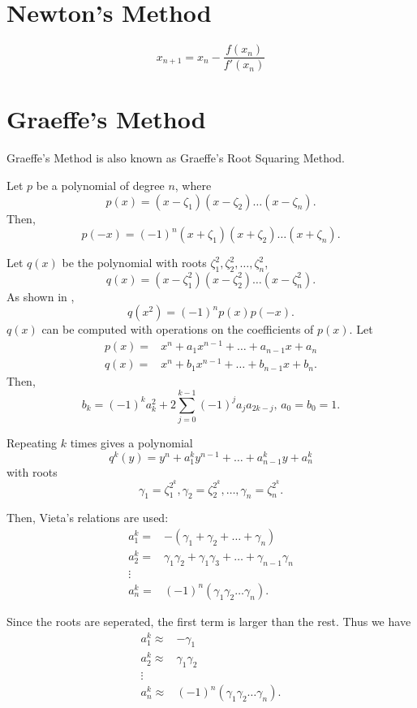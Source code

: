 \documentclass{article}
\begin{document}
\section{Newton's Method}

\begin{equation}
	x_{n+1}=x_n-\frac{f(x_n)}{f'(x_n)}
\end{equation}

\section{Graeffe's Method}

Graeffe's Method is also known as Graeffe's Root Squaring Method.

Let $p$ be a polynomial of degree $n$, where 
\[p(x)=(x-\zeta_1)(x-\zeta_2)\dots(x-\zeta_n).\]
Then,
\[p(-x)=(-1)^n(x+\zeta_1)(x+\zeta_2)\dots(x+\zeta_n).\]

Let $q(x)$ be the polynomial with roots $\zeta_1^2,\zeta_2^2,\dots,\zeta_n^2$,
\[q(x)=(x-\zeta_1^2)(x-\zeta_2^2)\dots(x-\zeta_n^2).\]
As shown in \cite{wiki:graeffe}, 
\[q(x^2)=(-1)^np(x)p(-x).\]
$q(x)$ can be computed with operations on the coefficients of $p(x)$.
Let
\begin{align*}
	p(x) =& x^n+a_1x^{n-1}+\dots+a_{n-1}x+a_n \\
	q(x) =& x^n+b_1x^{n-1}+\dots+b_{n-1}x+b_n. 
\end{align*}
Then,
\[b_k=(-1)^ka_k^2+2\sum_{j=0}^{k-1}(-1)^ja_ja_{2k-j},\,a_0=b_0=1.\]

Repeating $k$ times gives a polynomial
\[q^k(y)=y^n+a_1^ky^{n-1}+\dots+a_{n-1}^ky+a_n^k\]
with roots
\[\gamma_1=\zeta_1^{2^k},\gamma_2=\zeta_2^{2^k},\dots,\gamma_n=\zeta_n^{2^k}.\]

Then, Vieta's relations\cite{wiki:vieta} are used: 
\begin{align*}
	a_1^k =& -(\gamma_1+\gamma_2+\dots+\gamma_n) \\
	a_2^k =& \gamma_1\gamma_2+\gamma_1\gamma_3+\dots+\gamma_{n-1}\gamma_n \\
	\vdots & \\
	a_n^k =& (-1)^n(\gamma_1\gamma_2\dots\gamma_n).
\end{align*}

Since the roots are seperated, the first term is larger than the rest.\cite{mathworld:graeffe}
Thus we have
\begin{align*}
	a_1^k \approx& -\gamma_1 \\
	a_2^k \approx& \gamma_1\gamma_2 \\
	\vdots & \\
	a_n^k \approx& (-1)^n(\gamma_1\gamma_2\dots\gamma_n).
\end{align*}
\end{document}
